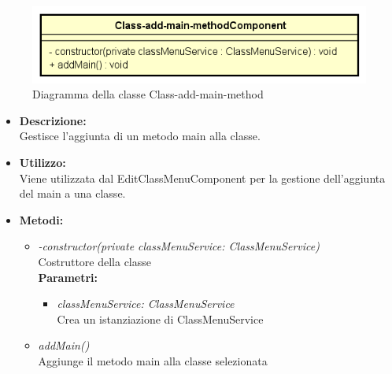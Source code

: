 \begin{figure}[h!]
	\centering
	\includegraphics[scale=0.8]{res/sections/SpecificaFrontEnd/Components/Disegnetti/class-add-main-method.png}
	\caption{Diagramma della classe Class-add-main-method}
\end{figure}

\begin{itemize}
	\item \textbf{Descrizione:}\\
	Gestisce l'aggiunta di un metodo main alla classe.
	\item \textbf{Utilizzo:}\\
	Viene utilizzata dal EditClassMenuComponent per la gestione dell'aggiunta del main a una classe.
	\item \textbf{Metodi:}
		\begin{itemize}
			\item \emph{-constructor(private classMenuService: ClassMenuService)}\\
    		Costruttore della classe\\
    		\textbf{Parametri:}
    		\begin{itemize}
    			\item \emph{classMenuService: ClassMenuService}\\
    			Crea un istanziazione di ClassMenuService
    		\end{itemize}
    		\item \emph{addMain()}\\
    		Aggiunge il metodo main alla classe selezionata
		\end{itemize}
\end{itemize}